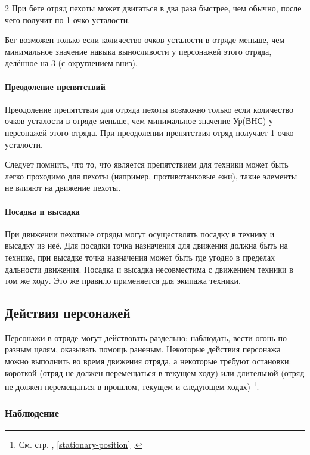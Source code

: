 \documentclass[twoside]{article}
\begin{document}
\begin{multicols}{2}
При беге отряд пехоты может двигаться в два раза быстрее, чем обычно,
после чего получит по 1 очко усталости.

Бег возможен только если количество очков усталости в отряде меньше, чем
минимальное значение навыка выносливости у персонажей этого отряда, делённое на 3
(с округлением вниз).

\paragraph{Преодоление препятствий}\label{obstacles}

Преодоление препятствия для отряда пехоты возможно только если
количество очков усталости в отряде меньше, чем минимальное значение
Ур(ВНС) у персонажей этого отряда. При преодолении препятствия отряд
получает 1 очко усталости.

Следует помнить, что то, что является препятствием для техники
может быть легко проходимо для пехоты (например, противотанковые ежи),
такие элементы не влияют на движение пехоты.

\paragraph{Посадка и высадка}\label{boarding-disembark}

При движении пехотные отряды могут осуществлять посадку в технику и
высадку из неё. Для посадки точка назначения для движения должна быть на
технике, при высадке точка назначения может быть где угодно в пределах
дальности движения. Посадка и высадка несовместима с движением техники в
том же ходу. Это же правило применяется для экипажа техники.

\subsection{Действия персонажей}\label{person-actions}

Персонажи в отряде могут действовать раздельно: наблюдать, вести огонь по разным целям, оказывать помощь раненым.
Некоторые действия персонажа можно выполнить во время движения отряда, а некоторые требуют остановки:
короткой (отряд не должен перемещаться в текущем ходу) или длительной (отряд не должен перемещаться в прошлом, текущем и следующем ходах)
\footnote{См. стр. \pageref{stationary-position}, \ref{stationary-position} .}.

\subsubsection{Наблюдение}\label{observation}


\end{multicols}
\end{document}
